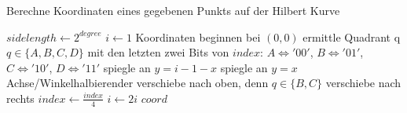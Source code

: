 \documentclass[course=erap]{aspdoc}
\begin{document}
\begin{algorithm}[h]
\scriptsize
\begin{algorithmic}
\caption{Berechne Koordinaten eines gegebenen Punkts auf der Hilbert Kurve}
\label{hilbert:iterative}
	\State $sidelength \leftarrow 2^{degree}$
	\State $i \leftarrow 1$
	\State Koordinaten beginnen bei $(0, 0)$
		\State ermittle Quadrant q $q \in \{A, B, C, D\}$ mit den letzten zwei Bits von $index$:
		\State $A \iff '00'$, $B \iff '01'$, $C \iff '10'$, $D \iff '11'$
			\State spiegle an $y = i-1-x$ 
			\Else 
			\State spiegle an $y=x$ Achse/Winkelhalbierender
			\EndIf
		\Else 
		\State verschiebe nach oben, denn $q \in \{B, C\}$
		\EndIf
		\State verschiebe nach rechts
		\EndIf
		\State $index \leftarrow \frac{index}{4}$ 
		\State $i \leftarrow 2i$
	\EndWhile
	\State \Return $coord$
\EndFunction
\end{algorithmic}
\end{algorithm}
\end{document}
